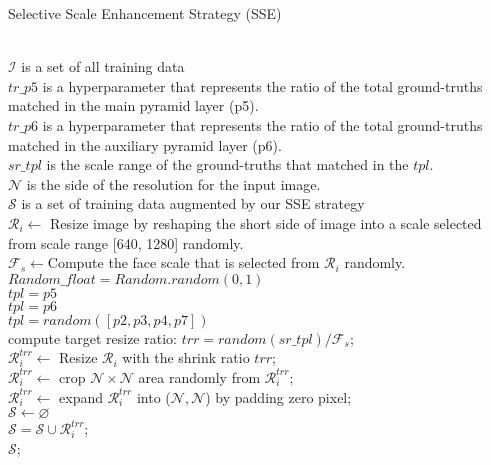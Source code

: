 \documentclass[10pt,twocolumn,letterpaper]{article}
\begin{document}
\begin{algorithm}[t!]
\small
\caption{Selective Scale Enhancement Strategy (SSE)} 
\label{algorithm}
\begin{algorithmic}[1]
\REQUIRE ~~\\
$\mathcal{I}$ is a set of all training data \\
$tr\_p5$ is a hyperparameter that represents the ratio of the total ground-truths matched in the main pyramid layer (p5). \\
$tr\_p6$ is a hyperparameter that represents the ratio of the total ground-truths matched in the auxiliary pyramid layer (p6). \\
$sr\_tpl$ is the scale range of the ground-truths that matched in the $tpl$. \\
$\mathcal{N}$ is the side of the resolution for the input image.
\ENSURE ~~\\
$\mathcal{S}$ is a set of training data augmented by our SSE strategy \\
\vspace{2mm}
\STATE $\mathcal{R}_{i} \leftarrow{}$ Resize image by reshaping the short side of image into a scale selected from scale range [640, 1280] randomly.\\
\STATE $\mathcal{F}_{s} \leftarrow{}$Compute the face scale that is selected from  $\mathcal{R}_{i}$ randomly. \\
\STATE $Random\_float = Random.random(0,1)$ \\
\STATE $tpl=p5$ \\
\STATE $tpl=p6$ \\
\ELSE
\STATE $tpl = random([p2, p3, p4, p7])$ \\
\ENDIF
\STATE compute target resize ratio: $trr = random(sr\_tpl) / \mathcal{F}_{s}$;\\
\STATE  $\mathcal{R}^{trr}_{i} \leftarrow{}$ Resize $\mathcal{R}_{i}$ with the shrink ratio $trr$; \\
\STATE $\mathcal{R}^{trr}_{i} \leftarrow{}$ crop $\mathcal{N} \times \mathcal{N}$ area randomly from $\mathcal{R}^{trr}_{i}$;  \\
\ELSE
\STATE $\mathcal{R}^{trr}_{i} \leftarrow{}$ expand $\mathcal{R}^{trr}_{i}$ into ($\mathcal{N}, \mathcal{N}$) by padding zero pixel;   \\
\ENDIF
{}
\STATE $\mathcal{S} \leftarrow{} \varnothing $ \\
\ENDIF
\STATE $\mathcal{S} = \mathcal{S} \cup  \mathcal{R}^{trr}_{i}$; \\
\ENDFOR
\RETURN $\mathcal{S}$;
\end{algorithmic}
\end{algorithm}
\end{document}
